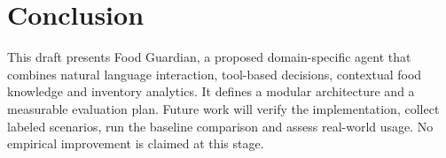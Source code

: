 \section{Conclusion}
This draft presents Food Guardian, a proposed domain-specific agent that combines natural language interaction, tool-based decisions, contextual food knowledge and inventory analytics. It defines a modular architecture and a measurable evaluation plan. Future work will verify the implementation, collect labeled scenarios, run the baseline comparison and assess real-world usage. No empirical improvement is claimed at this stage.
